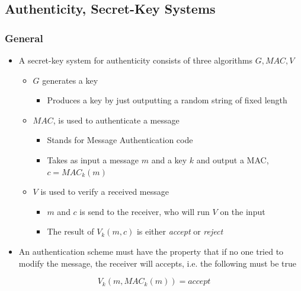 \documentclass[11pt]{article}
\begin{document}
\subsection{Authenticity, Secret-Key Systems}
\label{sec:org4b6b30f}
\subsubsection{General}
\label{sec:org25deca3}
\begin{itemize}
\item A secret-key system for authenticity consists of three algorithms \(G,MAC,V\)
\begin{itemize}
\item \(G\) generates a key
\begin{itemize}
\item Produces a key by just outputting a random string of fixed length
\end{itemize}
\item \(MAC\), is used to authenticate a message
\begin{itemize}
\item Stands for Message Authentication code
\item Takes as input a message \(m\) and a key \(k\) and output a MAC, \(c=MAC_k(m)\)
\end{itemize}
\item \(V\) is used to  verify a received message
\begin{itemize}
\item \(m\) and \(c\) is send to the receiver, who will run \(V\) on the input
\item The result of \(V_k(m,c)\) is either \emph{accept} or \emph{reject}
\end{itemize}
\end{itemize}

\item An authentication scheme must have the property that if no one tried to modify the message, the receiver will accepts, i.e. the following must be true
\end{itemize}
\begin{equation}
  V_k(m,MAC_k(m)) = accept
\end{equation}
\end{document}
